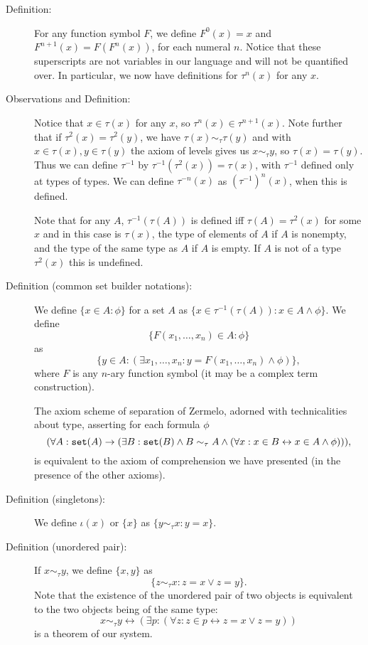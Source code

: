 \documentclass[12pt]{book}
\begin{document}
\begin{description}

\item[Definition:]  For any function symbol $F$, we define $F^0(x) = x$ and $F^{n+1}(x) = F(F^n(x))$, for each numeral $n$.  Notice that these superscripts
are not variables in our language and will not be quantified over.  In particular, we now have definitions for $\tau^n(x)$ for any $x$.

\item[Observations and Definition:]  Notice that $x \in \tau(x)$ for any $x$, so $\tau^n(x) \in \tau^{n+1}(x)$.  Note further that if $\tau^2(x) = \tau^2(y)$, we have
$\tau(x) \sim_\tau \tau(y)$ and with $x \in \tau(x),y \in \tau(y)$ the axiom of levels gives us $x \sim_\tau y$, so $\tau(x)=\tau(y)$.  Thus we can define $\tau^{-1}$ by
$\tau^{-1}(\tau^2(x)) = \tau(x)$, with $\tau^{-1}$ defined only at types of types.  We can define $\tau^{-n}(x)$ as $(\tau^{-1})^n(x)$, when this is defined.

Note that for any $A$, $\tau^{-1}(\tau(A))$ is defined iff $\tau(A) = \tau^2(x)$ for some $x$ and in this case is $\tau(x)$, the type of elements of $A$ if $A$ is nonempty,
and the type of the same type as $A$ if $A$ is empty.  If $A$ is not of a type $\tau^2(x)$ this is undefined.

\item[Definition (common set builder notations):]  We define $\{x \in A:\phi\}$ for a set $A$ as $\{x \in \tau^{-1}(\tau(A)):x \in A \wedge \phi\}$.  We define $$\{F(x_1,\ldots,x_n) \in A:\phi\}$$ as $$\{y \in A:(\exists x_1,\ldots,x_n:y = F(x_1,\ldots,x_n) \wedge \phi)\},$$ where $F$ is any $n$-ary  function symbol (it may be a complex term construction).

The axiom scheme of separation of Zermelo, adorned with technicalities about type, asserting for each formula $\phi$ $$(\forall A:{\tt set}(A)\rightarrow (\exists B:{\tt set}(B) \wedge B \sim_\tau A \wedge (\forall x:x \in B \leftrightarrow x \in A \wedge \phi))),$$ is equivalent to the axiom of comprehension we have presented (in the presence of the other axioms).

\item[Definition (singletons):]  We define $\iota(x)$ or $\{x\}$ as $\{y \sim_\tau x:y=x\}$.

\item[Definition (unordered pair):]  If $x \sim_\tau y$, we define $\{x,y\}$ as $$\{z \sim_\tau x:z=x \vee z=y\}.$$  Note that the existence of the unordered pair of two objects is equivalent to the two objects being of the same type: $$x \sim_\tau y \leftrightarrow(\exists p:(\forall z:z \in p \leftrightarrow z=x \vee z=y)) $$  is a theorem of our system.

\end{description}
\end{document}
